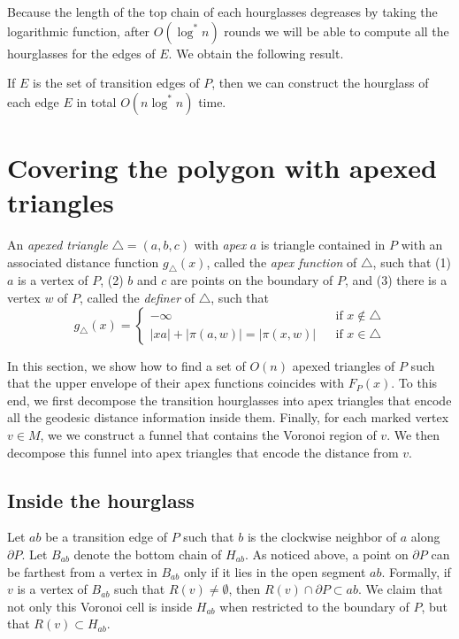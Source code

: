 \documentclass[a4paper,UKenglish]{lipics}
\newcommand{\F}[2]{\ensuremath{F_{\scriptscriptstyle #1}(#2)}}
\newcommand{\g}[2]{\ensuremath{|\pi(#1, #2)|}}
\begin{document}
Because the length of the top chain of each hourglasses degreases by taking the logarithmic function, after $O(\log^*n)$ rounds we will be able to compute all the hourglasses for the edges of $E$. We obtain the following result.

\begin{lemma}\label{lemma: Hourglass partition}
If $E$ is the set of transition edges of $P$, then we can construct the hourglass of each edge $E$ in total $O(n \log^* n)$ time.
\end{lemma}

\section{Covering the polygon with apexed triangles}
An \emph{apexed triangle} $\triangle = (a,b,c)$ with \emph{apex} $a$ is triangle contained in $P$ with an associated distance function $g_\triangle(x)$, called the \emph{apex function} of $\triangle$, such that (1) $a$ is a vertex of $P$, (2) $b$ and $c$ are points on the boundary of $P$, and (3) there is a  vertex $w$ of  $P$, called the \emph{definer} of $\triangle$, such that
$$g_\triangle(x) = \left\{ \begin{array}{lll}
-\infty&&\text{if $x\notin \triangle$}\\
|xa| + \g{a}{w} = \g{x}{w} && \text{if $x\in \triangle$}
\end{array}\right.$$

In this section, we show how to find a set of $O(n)$ apexed triangles of $P$ such that the upper envelope of their apex functions coincides with $\F{P}{x}$.
To this end, we first decompose the transition hourglasses into apex triangles that encode all the geodesic distance information inside them. Finally, for each marked vertex $v\in M$, we we construct a funnel that contains the Voronoi region of $v$.  We then decompose this funnel into apex triangles that encode the distance from $v$.

\subsection{Inside the hourglass}
Let $ab$ be a transition edge of $P$  such that $b$ is the clockwise neighbor of $a$ along $\partial P$.
Let $B_{ab}$ denote the bottom chain of $H_{ab}$.
As noticed above, a point on $\partial P$ can be farthest from a vertex in $B_{ab}$ only if it lies in the open segment $ab$.
Formally, if $v$ is a vertex of $B_{ab}$ such that $R(v)\neq \emptyset$, then $R(v)\cap \partial P \subset ab$.
We claim that not only this Voronoi cell is inside $H_{ab}$ when restricted to the boundary of $P$, but that $R(v)\subset H_{ab}$. 
\end{document}
